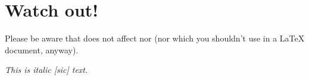 \documentclass[DIV10,toc=index,toc=bib]{cnpkgdoc}
\begin{document}
\section{Watch out!}
Please be aware that \embrac does not affect  nor  (nor
 which you shouldn't use in a \LaTeX{} document, anyway).
\begin{beispiel}
 \itshape This is italic [sic] text.
\end{beispiel}

\printbibliography

\printindex
\end{document}
